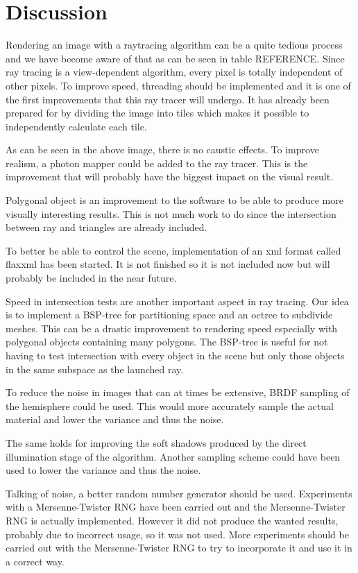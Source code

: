 \documentclass[a4paper]{report}
\begin{document}
\chapter{Discussion}
\label{ch:discussion}

Rendering an image with a raytracing algorithm can be a quite tedious
process and we have become aware of that as can be seen in table
REFERENCE. Since ray tracing is a view-dependent algorithm, every
pixel is totally independent of other pixels. To improve speed,
threading should be implemented and it
is one of the first improvements that this ray tracer will undergo. It
has already been prepared for by dividing the image into tiles which
makes it possible to independently calculate each tile.

As can be seen in the above image, there is no caustic effects. To
improve realism, a photon mapper could be added to the ray
tracer. This is the improvement that will probably have the biggest
impact on the visual result.

Polygonal object is an improvement to the software to be able to
produce more visually interesting results. This is not much work to do
since the intersection between ray and triangles are already included.

To better be able to control the scene, implementation of an xml
format called flaxxml has been started. It is not finished so it is
not included now but will probably be included in the near future.

Speed in intersection tests are another important aspect in ray
tracing. Our idea is to implement a BSP-tree for partitioning space
and an octree to subdivide meshes. This can be a drastic improvement
to rendering speed especially with polygonal objects containing many
polygons. The BSP-tree is useful for not having to test intersection
with every object in the scene but only those objects in the same
subspace as the launched ray.

To reduce the noise in images that can at times be extensive, BRDF
sampling of the hemisphere could be used. This would more accurately
sample the actual material and lower the variance and thus the noise.

The same holds for improving the soft shadows produced by the direct
illumination stage of the algorithm. Another sampling scheme could
have been used to lower the variance and thus the noise.

Talking of noise, a better random number generator should be
used. Experiments with a Mersenne-Twister RNG have been carried out
and the Mersenne-Twister RNG is actually implemented. However it did
not produce the wanted results, probably due to incorrect usage, so it
was not used. More experiments should be carried out with the
Mersenne-Twister RNG to try to incorporate it and use it in a correct way.
\end{document}
